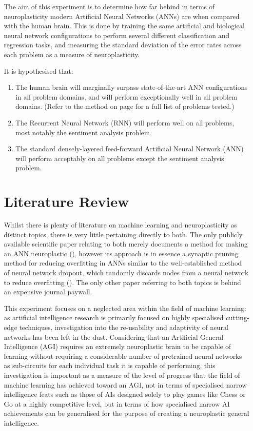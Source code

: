 \documentclass[]{report}
\begin{document}
The aim of this experiment is to determine how far behind in terms of neuroplasticity modern Artificial Neural Networks (ANNs) are when compared with the human brain. This is done by training the same artificial and biological neural network configurations to perform several different classification and regression tasks, and measuring the standard deviation of the error rates across each problem as a measure of neuroplasticity.

It is hypothesised that:
\begin{enumerate}
	\item The human brain will marginally surpass state-of-the-art ANN configurations in all problem domains, and will perform exceptionally well in all problem domains. (Refer to the method on page \pageref{itm:Method} for a full list of problems tested.)
	\item The Recurrent Neural Network (RNN) will perform well on all problems, most notably the sentiment analysis problem.
	\item The standard densely-layered feed-forward Artificial Neural Network (ANN) will perform acceptably on all problems except the sentiment analysis problem.
\end{enumerate}

\section{Literature Review}

Whilst there is plenty of literature on machine learning and neuroplasticity as distinct topics, there is very little pertaining directly to both. The only publicly available scientific paper relating to both merely documents a method for making an ANN neuroplastic (\cite{perwej12}), however its approach is in essence a synaptic pruning method for reducing overfitting in ANNs similar to the well-established method of neural network dropout, which randomly discards nodes from a neural network to reduce overfitting (\cite{dropout14}). The only other paper referring to both topics is behind an expensive journal paywall.

This experiment focuses on a neglected area within the field of machine learning: as artificial intelligence research is primarily focused on highly specialised cutting-edge techniques, investigation into the re-usability and adaptivity of neural networks has been left in the dust. Considering that an Artificial General Intelligence (AGI) requires an extremely neuroplastic brain to be capable of learning without requiring a considerable number of pretrained neural networks as sub-circuits for each individual task it is capable of performing, this investigation is important as a measure of the level of progress that the field of machine learning has achieved toward an AGI, not in terms of specialised narrow intelligence feats such as those of AIs designed solely to play games like Chess or Go at a highly competitive level, but in terms of how specialised narrow AI achievements can be generalised for the purpose of creating a neuroplastic general intelligence.
\end{document}
